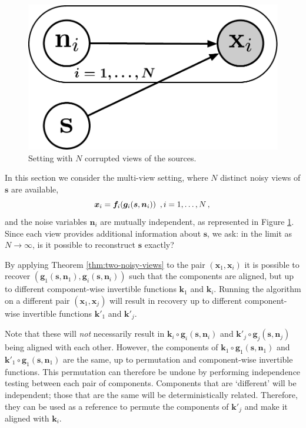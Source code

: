 \documentclass[letterpaper]{article}
\theoremstyle{definition}
\begin{document}
\begin{figure}[t!]
    \centering
    \includegraphics[scale=0.3]{img_pdf/generalized_hsr_many.pdf}
    \caption{Setting with $N$ corrupted views of the sources.}
    \label{fig:generalized_hsr_many}
\end{figure}

In this section we consider the multi-view setting, where $N$ distinct noisy views of $\bm{s}$ are available,
\begin{equation*}
\bm{x}_{i}=\bm{f}_{i}(\bm{g}_{i}(\bm{s},\bm{n}_{i}))\,\,\,,i=1, \ldots, N\,, \label{eq:multi}\\
\end{equation*}
and the noise variables $\bm{n}_{i}$ are mutually independent, as represented in Figure \ref{fig:generalized_hsr_many}.
Since each view provides additional information about $\bm{s}$, we ask: in the limit as $N \to \infty$, is it possible to reconstruct $\bm{s}$ exactly?


By applying Theorem \ref{thm:two-noisy-views} to the pair $(\bm{x}_1,\bm{x}_i)$ it is possible to recover  $(\bm{g}_1(\bm{s},\bm{n}_1),\bm{g}_i(\bm{s},\bm{n}_i))$ such that the components are aligned, but up to different component-wise invertible functions $\bm{k}_1$ and $\bm{k}_i$.
Running the algorithm on a different pair  $(\bm{x}_1,\bm{x}_{j})$ will result in recovery up to different component-wise invertible functions $\bm{k}'_1$ and $\bm{k}'_j$.

Note that these will \emph{not} necessarily result in  $\bm{k}_i\circ\bm{g}_i(\bm{s},\bm{n}_i)$ and $\bm{k}'_j\circ\bm{g}_j(\bm{s},\bm{n}_j)$ being aligned with each other.
However, the components of $\bm{k}_1\circ\bm{g}_1(\bm{s},\bm{n}_1)$ and $\bm{k}'_1\circ\bm{g}_1(\bm{s},\bm{n}_1)$ are the same, up to permutation and component-wise invertible functions.
This permutation can therefore be undone by performing independence testing between each pair of components.
Components that are `different' will be independent; those that are the same will be deterministically related.
Therefore, they can be used as a reference to permute the components of $\bm{k}'_j$ and make it aligned with $\bm{k}_i$.
\end{document}
